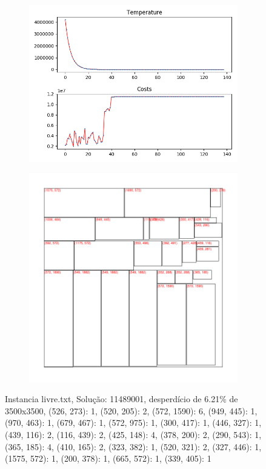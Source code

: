 \begin{figure}
\centering
\begin{subfigure}{.5\textwidth}
  \centering
  \includegraphics[width=1\linewidth]{results/livre/1/plot}
  \label{fig:sub1}
\end{subfigure}%
\begin{subfigure}{.5\textwidth}
  \centering
  \includegraphics[width=1\linewidth]{results/livre/1/cut}
  \label{fig:sub2}
\end{subfigure}
\caption{Instancia livre.txt, Solução: 11489001, desperdício de 6.21\% de 3500x3500, {(526, 273): 1, (520, 205): 2, (572, 1590): 6, (949, 445): 1, (970, 463): 1, (679, 467): 1, (572, 975): 1, (300, 417): 1, (446, 327): 1, (439, 116): 2, (116, 439): 2, (425, 148): 4, (378, 200): 2, (290, 543): 1, (365, 185): 4, (410, 165): 2, (323, 382): 1, (520, 321): 2, (327, 446): 1, (1575, 572): 1, (200, 378): 1, (665, 572): 1, (339, 405): 1}}
\label{fig:test}
\end{figure}

